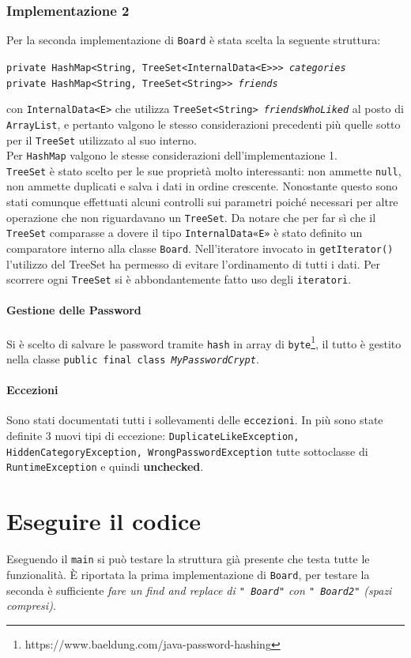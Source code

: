 \documentclass[10pt, a4paper]{article}
\begin{document}
\subsubsection{Implementazione 2}
Per la seconda implementazione di \texttt{Board} è stata scelta la seguente struttura: 
\begin{center}
\texttt{private HashMap<String, TreeSet<InternalData<E>>> \emph{categories}\\
	private HashMap<String, TreeSet<String>> \emph{friends}}
\end{center}
con \texttt{InternalData<E>} che utilizza \texttt{TreeSet<String> \emph{friendsWhoLiked}}
al posto di \texttt{ArrayList}, e pertanto valgono le stesso considerazioni precedenti più quelle sotto per il \texttt{TreeSet} utilizzato al suo interno.\\
Per \texttt{HashMap} valgono le stesse considerazioni dell'implementazione 1.\\
\texttt{TreeSet} è stato scelto per le sue proprietà molto interessanti: non ammette \texttt{null}, non ammette duplicati e salva i dati in ordine crescente. Nonostante questo sono stati comunque effettuati alcuni controlli sui parametri poiché necessari per altre operazione che non riguardavano un \texttt{TreeSet}.
Da notare che per far sì che il \texttt{TreeSet} comparasse a dovere il tipo \texttt{InternalData«E»} è stato definito un comparatore interno alla classe \texttt{Board}. Nell'iteratore invocato in \texttt{getIterator()} l'utilizzo del TreeSet ha permesso di evitare l'ordinamento di tutti i dati.
Per scorrere ogni \texttt{TreeSet} si è abbondantemente fatto uso degli \texttt{iteratori}.
\paragraph{Gestione delle Password} Si è scelto di salvare le password tramite \texttt{hash} in array di \texttt{byte}\footnote{https://www.baeldung.com/java-password-hashing}, il tutto è gestito nella classe \texttt{public final class \emph{MyPasswordCrypt}}.
\paragraph{Eccezioni} Sono stati documentati tutti i sollevamenti delle \texttt{eccezioni}. In più sono state definite 3 nuovi tipi di eccezione: \texttt{DuplicateLikeException, HiddenCategoryException, WrongPasswordException} tutte sottoclasse di \texttt{RuntimeException} e quindi \textbf{unchecked}.
\section{Eseguire il codice}
Eseguendo il \texttt{main} si può testare la struttura già presente che testa tutte le funzionalità.
È riportata la prima implementazione di \texttt{Board}, per testare la seconda è sufficiente \textsl{fare un find and replace di \texttt{" Board"} con \texttt{" Board2"} (spazi compresi)}.
\end{document}
